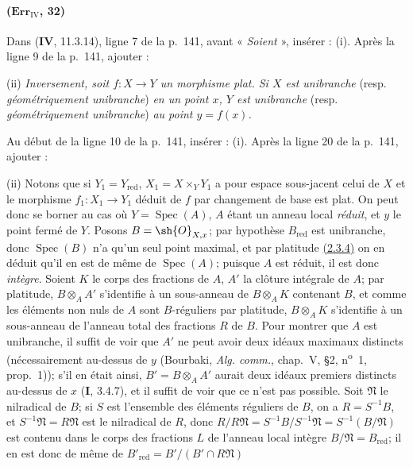\paragraph{($\mathbf{Err}_{\mathrm{IV}}$, 32)}
Dans (\textbf{IV}, 11.3.14), ligne 7 de la p.~141, avant « \emph{Soient} », insérer :
(i). Après la ligne 9 de la p.~141, ajouter :

\smallskip
\noindent
\textup{(ii)} \emph{Inversement, soit $f:X\to Y$ un morphisme plat. Si $X$
est unibranche} (resp. \emph{géométriquement unibranche}) \emph{en un point $x$, $Y$
est unibranche} (resp. \emph{géométriquement unibranche}) \emph{au point $y=f(x)$.}

Au début de la ligne 10 de la p.~141, insérer : (i). Après la ligne 20
de la p.~141, ajouter :

\smallskip
\noindent
\textup{(ii)} Notons que si $Y_1=Y_{\mathrm{red}}$,
$X_1=X\times_Y Y_1$ a pour espace sous-jacent celui de $X$ et le
morphisme $f_1:X_1\to Y_1$ déduit de $f$ par changement de base est
plat. On peut donc se borner au cas où $Y=\operatorname{Spec}(A)$,
$A$ étant un anneau local \emph{réduit}, et $y$ le point fermé de $Y$. Posons
$B=\sh{O}_{X,x}$; par hypothèse $B_{\mathrm{red}}$ est unibranche, donc
$\operatorname{Spec}(B)$ n'a qu'un seul point maximal, et par platitude
{\hyperref[canon-index.ega4.c04.prop.2-3-4]{(2.3.4)}} on en déduit qu'il en est de
même
de $\operatorname{Spec}(A)$; puisque $A$ est réduit, il est donc
\emph{intègre}. Soient $K$ le corps des fractions de $A$, $A'$ la clôture
intégrale de $A$; par platitude, $B\otimes_AA'$ s'identifie à un
sous-anneau de $B\otimes_AK$ contenant $B$, et comme les éléments non
nuls de $A$ sont $B$-réguliers par platitude, $B\otimes_AK$ s'identifie
à un sous-anneau de l'anneau total des fractions $R$ de $B$. Pour
montrer que $A$ est unibranche, il suffit de voir que $A'$ ne peut avoir
deux idéaux maximaux distincts (nécessairement au-dessus de $y$
(Bourbaki, \emph{Alg. comm.}, chap.~V, \S2,
n\textsuperscript{o}~1, prop.~1)); s'il en était ainsi,
$B'=B\otimes_AA'$ aurait deux idéaux premiers distincts au-dessus de
$x$ (\textbf{I}, 3.4.7), et il suffit de voir que ce n'est pas possible.
Soit $\mathfrak N$ le nilradical de $B$; si $S$ est l'ensemble des
éléments réguliers de $B$, on a $R=S^{-1}B$, et
$S^{-1}\mathfrak N=R\mathfrak N$ est le nilradical de $R$, donc
$R/R\mathfrak N=S^{-1}B/S^{-1}\mathfrak N=S^{-1}(B/\mathfrak N)$
est contenu dans le corps des fractions $L$ de l'anneau local intègre
$B/\mathfrak N=B_{\mathrm{red}}$; il en est donc de même de
$B'_{\mathrm{red}}=B'/(B'\cap R\mathfrak N)$
